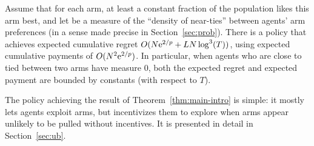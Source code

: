 



\begin{theorem} \label{thm:main-intro}
Assume that for each arm, at least a constant fraction \MinProb
of the population likes this arm best,
and let \TieDensity be a measure of the ``density of near-ties''
between agents' arm preferences
(in a sense made precise in Section~\ref{sec:prob}).
There is a policy that achieves expected 
cumulative regret $O (N \mathrm{e}^{2/p} + L N \log^3(T))$,
using expected cumulative payments of $O(N^2 \mathrm{e}^{2/p})$.
In particular, when agents who are close to tied between two arms have measure $0$,
both the expected regret and expected payment are bounded by constants
(with respect to $T$). 
\end{theorem}


The policy achieving the result of Theorem~\ref{thm:main-intro} is
simple: it mostly lets agents exploit arms, but incentivizes
them to explore when arms appear unlikely to be pulled without incentives.
It is presented in detail in Section~\ref{sec:ub}.
